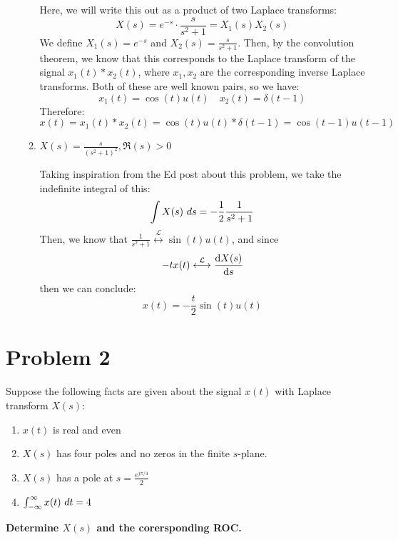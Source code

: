\documentclass[10pt]{article}
\begin{document}
\begin{enumerate}[label=\alph*)]
\begin{enumerate}[label=\alph*)]
					\begin{solution}
						Here, we will write this out as a product of two Laplace transforms:
						\[
						X(s) = e^{-s} \cdot \frac{s}{s^2 + 1} = X_1(s)X_2(s)
						\] 
						We define \( X_1(s) = e^{-s} \) and \( X_2(s) = \frac{s}{s^2 + 1} \). Then, by the 
						convolution theorem, we know that this corresponds to the Laplace transform of 
						the signal \( x_1(t) * x_2(t) \), where \( x_1, x_2 \) are the corresponding inverse 
						Laplace transforms. Both of these are well known pairs, so we have:
						\[
						x_1(t) = \cos(t) u(t) \quad x_2(t) = \delta(t - 1) 
						\] 
						Therefore:
						\[
						x(t) = x_1(t) * x_2(t) = \cos(t)u(t) * \delta(t - 1) = \cos(t - 1) u(t- 1)
						\] 
					\end{solution}
				\item \( X(s) = \frac{s}{(s^2+ 1)^2}, \Re(s) > 0 \)

					\begin{solution}
						Taking inspiration from the Ed post about this problem, we take the indefinite integral of this:
						\[
						\int X(s) \ d s = -\frac{1}{2}\frac{1}{s^2 + 1}
						\] 
						Then, we know that \( \frac{1}{s^2 + 1}\overset{\mathcal L}{\longleftrightarrow} 
						\sin(t) u(t)\), and since 
						\[
							-t x(t) \overset{\mathcal L}{\longleftrightarrow} \dv{X(s)}{s}
						\] 
						then we can conclude:
						\[
						x(t) = -\frac{t}{2}\sin(t) u(t)
						\] 
					\end{solution}
			\end{enumerate}
		\end{enumerate}
	\pagebreak
	\section*{Problem 2}
	Suppose the following facts are given about the signal \( x(t) \) with Laplace transform \( X(s) \):
	\begin{enumerate}[label=\alph*)]
		\item \( x(t) \) is real and even
		\item \( X(s) \) has four poles and no zeros in the finite \( s \)-plane. 
		\item \( X(s) \) has a pole at \( s = \frac{e^{j \pi /4}}{2} \) 
		\item \( \int_{-\infty}^{\infty} x(t) \ d t = 4  \)
	\end{enumerate}
	\textbf{Determine \( X(s) \) and the corersponding ROC.}
\end{document}
